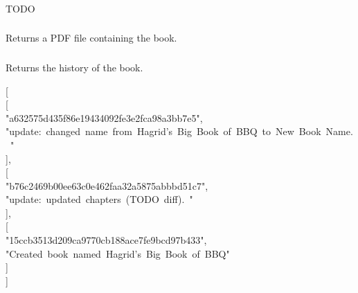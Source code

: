 \documentclass[onecolumn, draftclsnofoot, 10pt, compsoc]{IEEEtran}
\begin{document}
\subsubsection{}\label{sec-post-booksauthoruuidfork}%

\noindent TODO%

\subsubsection{}\label{sec-get-booksauthoruuidpdf}%

\noindent Returns a PDF file containing the book.%

\subsubsection{}\label{sec-get-booksauthoruuidhistory}%

\noindent Returns the history of the book.%
\begin{mdpre}%
\noindent{}[\\
[\\
"a632575d435f86e19434092fe3e2fca98a3bb7e5",\\
"update:~changed~name~from~Hagrid's~Big~Book~of~BBQ~to~New~Book~Name.~"\\
],\\
[\\
"b76c2469b00ee63c0e462faa32a5875abbbd51c7",\\
"update:~updated~chapters~(TODO~diff).~"\\
],\\
[\\
"15ccb3513d209ca9770cb188ace7fe9bcd97b433",\\
"Created~book~named~Hagrid's~Big~Book~of~BBQ"\\
]\\
]%
\end{mdpre}
\subsubsection{}\label{sec-post-booksnew}%
\end{document}
